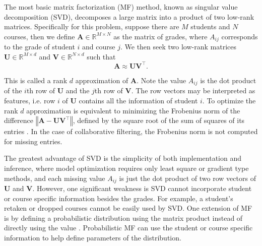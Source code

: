 \documentclass[12pt]{article}
\begin{document}
The most basic matrix factorization (MF) method,
known as singular value decomposition (SVD),
decomposes a large matrix into a product of two low-rank matrices.
Specifically for this problem, 
suppose there are $M$ students and $N$ courses,
then we define $\mathbf{A} \in \mathbb{R}^{M \times N}$ 
as the matrix of grades,
where $A_{ij}$ corresponds to the grade of 
student $i$ and course $j$.
We then seek two low-rank matrices 
$\mathbf{U} \in \mathbb{R}^{M \times d}$ 
and $\mathbf{V} \in \mathbb{R}^{N \times d}$ such that
%
\begin{equation}
	\mathbf{A} \approx \mathbf{UV}^\top .
\end{equation}

This is called a rank $d$ approximation of $\mathbf{A}$.
Note the value $A_{ij}$ is the dot product of
the $i$th row of $\mathbf{U}$ and 
the $j$th row of $\mathbf{V}$.
The row vectors may be interpreted as features,
i.e. row $i$ of $\mathbf{U}$ contains all the information
of student $i$.
To optimize the rank $d$ approximation is 
equivalent to minimizing the Frobenius norm of the difference
$\left\Vert \mathbf{A - UV}^\top \right\Vert$,
defined by the square root of the
sum of squares of its entries \cite{FeHeKh12}.
In the case of collaborative filtering,
the Frobenius norm is not computed for missing entries.



The greatest advantage of SVD is the simplicity of 
both implementation and inference,
where model optimization requires only least square
or gradient type methods,
and each missing value $A_{ij}$ is just 
the dot product of two row vectors of $\mathbf{U}$
and $\mathbf{V}$.
However, one significant weakness is SVD cannot incorporate 
student or course specific information besides the grades.
For example, a student's retaken or dropped courses cannot be easily
used by SVD.
One extension of MF is by defining a probabilistic distribution 
using the matrix product instead of directly using the value \cite{MnSa07}.
Probabilistic MF can use the student or course 
specific information to help define parameters of the distribution.
\end{document}
